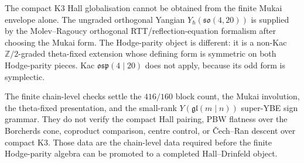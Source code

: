 \begin{remark}
\label{rem:k3y-hodge-parity-globalisation-obstruction}
The compact K3 Hall globalisation cannot be obtained from the finite
Mukai envelope alone. The ungraded orthogonal Yangian
\(Y_\hbar(\mathfrak{so}(4,20))\) is supplied by the
Molev--Ragoucy orthogonal RTT/reflection-equation formalism after
choosing the Mukai form. The Hodge-parity object is different: it is
a non-Kac \(\mathbb Z/2\)-graded theta-fixed extension whose defining
form is symmetric on both Hodge-parity pieces. Kac
\(\mathfrak{osp}(4\mid20)\) does not apply, because its odd form is
symplectic.

The finite chain-level checks settle the \(416/160\) block count,
the Mukai involution, the theta-fixed presentation, and the
small-rank \(Y(\mathfrak{gl}(m\mid n))\) super-YBE sign grammar.
They do not verify the compact Hall pairing, PBW flatness over the
Borcherds cone, coproduct comparison, centre control, or
\v{C}ech--Ran descent over compact K3. Those data are the
chain-level data required before the finite Hodge-parity algebra
can be promoted to a completed Hall--Drinfeld object.
\end{remark}

